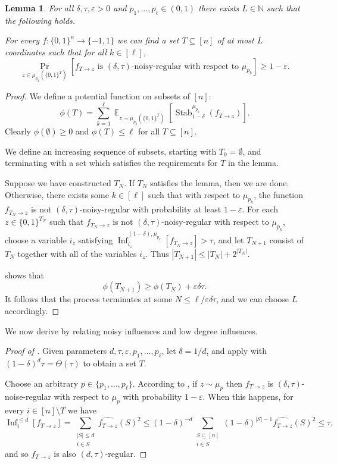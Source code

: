 \documentclass{article}
\newtheorem{lemma}[theorem]{Lemma}
\theoremstyle{definition}
\theoremstyle{remark}
\DeclareMathOperator*{\E}{\mathbb{E}}
\DeclareMathOperator{\Inf}{Inf}
\DeclareMathOperator{\Stab}{Stab}
\newcommand\eps{\varepsilon}
\renewcommand\epsilon{\eps}
\renewcommand\geq{\geqslant}
\renewcommand\leq{\leqslant}
\renewcommand\ge{\geqslant}
\begin{document}
\begin{lemma} \label{lem:jones-noisy-influences}
For all $\delta,\tau,\epsilon > 0$ and $p_1,\ldots,p_\ell \in (0,1)$ there exists $L \in \mathbb{N}$ such that the following holds.

For every $f\colon \{0,1\}^n \to \{-1,1\}$ we can find a set $T \subseteq [n]$ of at most $L$ coordinates such that for all $k \in [\ell]$,
\[
 \Pr_{z \in \mu_{p_k}(\{0,1\}^T)}[f_{T \to z} \text{ is $(\delta,\tau)$-noisy-regular with respect to $\mu_{p_k}$}] \geq 1-\epsilon.
\]
\end{lemma}
\begin{proof}
We define a potential function on subsets of $[n]$:
\[
\phi(T) = \sum_{k=1}^\ell \E_{z \sim \mu_{p_k}(\{0,1\}^T)}[\Stab_{1-\delta}^{\mu_{p_k}}(f_{T \to z})].
\]
Clearly $\phi(\emptyset) \ge 0$ and $\phi(T) \leq \ell$ for all $T \subseteq [n]$.

We define an increasing sequence of subsets, starting with $T_0 = \emptyset$, and terminating with a set which satisfies the requirements for $T$ in the lemma. 

Suppose we have constructed $T_N$. If $T_N$ satisfies the lemma, then we are done. Otherwise, there exists some $k \in [\ell]$ such that with respect to $\mu_{p_k}$, the function $f_{T_N \to z}$ is not $(\delta,\tau)$-noisy-regular with probability at least $1-\epsilon$.
For each $z \in \{0,1\}^{T_N}$ such that $f_{T_N \to z}$ is not $(\delta,\tau)$-noisy-regular with respect to $\mu_{p_k}$, choose a variable $i_z$ satisfying $\Inf_{i_z}^{(1-\delta),\mu_{p_k}}[f_{T_N \to z}] > \tau$, and let $T_{N+1}$ consist of $T_N$ together with all of the variables $i_z$. Thus $|T_{N+1}| \leq |T_N| + 2^{|T_N|}$.

 shows that
\[
 \phi(T_{N+1}) \geq \phi(T_N) + \epsilon \delta \tau.
\]
It follows that the process terminates at some $N \leq \ell/\epsilon\delta\tau$, and we can choose $L$ accordingly.
\end{proof}

We now derive  by relating noisy influences and low degree influences.
\begin{proof}[Proof of ]
Given parameters $d,\tau,\epsilon,p_1,\ldots,p_\ell$, let $\delta = 1/d$, and apply  with $(1-\delta)^d \tau = \Theta(\tau)$ to obtain a set $T$.

Choose an arbitrary $p \in \{p_1,\ldots,p_\ell\}$. According to , if $z \sim \mu_p$ then $f_{T \to z}$ is $(\delta,\tau)$-noise-regular with respect to $\mu_p$ with probability $1-\epsilon$. When this happens, for every $i \in [n] \setminus T$ we have
\[
 \Inf_i^{\leq d}[f_{T \to z}] = \sum_{\substack{|S| \leq d \\ i \in S}} \widehat{f_{T \to z}}(S)^2 \leq (1-\delta)^{-d} \sum_{\substack{S \subseteq [n] \\ i \in S}} (1-\delta)^{|S|-1} \widehat{f_{T \to z}}(S)^2 \leq \tau,
\]
and so $f_{T \to z}$ is also $(d,\tau)$-regular.
\end{proof}
\end{document}
